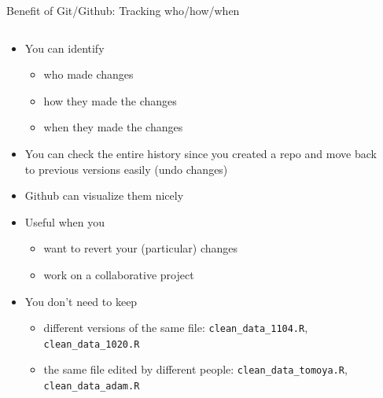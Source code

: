 \documentclass[handout,pdftex,10pt,aspectratio=169]{beamer}
\begin{document}
\begin{frame}{Benefit of Git/Github: Tracking who/how/when}
  \setlength{\leftmarginii}{10pt}
  \begin{columns}%
    \begin{column}{0.46\linewidth}
    \begin{itemize}
      \item<1-> You can identify %
      \begin{itemize}
        \item<1-> who made changes
        \item<2-> how they made the changes
        \item<3-> when they made the changes
      \end{itemize}
      \item<4-> You can check the entire history since you created a repo
      and move back to previous versions easily (undo changes)
      \item<5-> Github can visualize them nicely
      \medskip
      \item<7-> Useful when you
      \begin{itemize}
        \item<7-> want to revert your (particular) changes
        \item<8-> work on a collaborative project
      \end{itemize}
      \medskip
      \item<9-> You don't need to keep
      \begin{itemize}
        \item<9-> different versions of the same file: \texttt{clean\_data\_1104.R}, \texttt{clean\_data\_1020.R}
        \item<10-> the same file edited by different people: \texttt{clean\_data\_tomoya.R}, \texttt{clean\_data\_adam.R}
      \end{itemize}
    \end{itemize}
  \end{column}\hfill
  \begin{column}{0.53\linewidth}
    \centering

\end{column}
\end{columns}
\end{frame}
\end{document}
